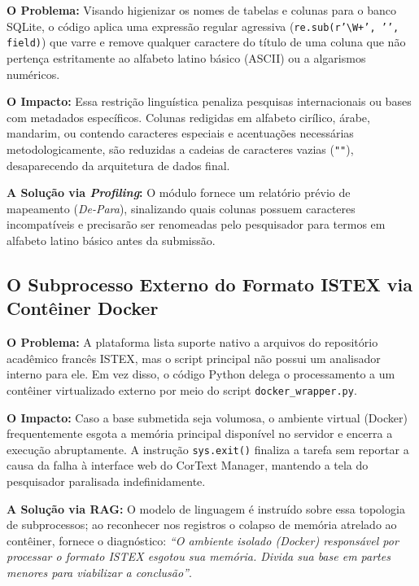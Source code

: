\documentclass[
	oneside,
	a4paper,
	12pt,
	chapter=TITLE,
	section=TITLE,
	english,
	brazilian
]{abntex2}
\begin{document}
\begin{apendicesenv}
\textbf{O Problema:} Visando higienizar os nomes de tabelas e colunas para o banco SQLite, o código aplica uma expressão regular agressiva (\texttt{re.\allowbreak sub(r'\textbackslash{}W+', '{}', field)}) que varre e remove qualquer caractere do título de uma coluna que não pertença estritamente ao alfabeto latino básico (ASCII) ou a algarismos numéricos.

\textbf{O Impacto:} Essa restrição linguística penaliza pesquisas internacionais ou bases com metadados específicos. Colunas redigidas em alfabeto cirílico, árabe, mandarim, ou contendo caracteres especiais e acentuações necessárias metodologicamente, são reduzidas a cadeias de caracteres vazias (\texttt{""}), desaparecendo da arquitetura de dados final.

\textbf{A Solução via \textit{Profiling}:} O módulo fornece um relatório prévio de mapeamento (\textit{De-Para}), sinalizando quais colunas possuem caracteres incompatíveis e precisarão ser renomeadas pelo pesquisador para termos em alfabeto latino básico antes da submissão.

\FloatBarrier
\subsection{O Subprocesso Externo do Formato ISTEX via Contêiner Docker}\label{sec:o_subprocesso_externo_do_formato_istex_v}


\textbf{O Problema:} A plataforma lista suporte nativo a arquivos do repositório acadêmico francês ISTEX, mas o script principal não possui um analisador interno para ele. Em vez disso, o código Python delega o processamento a um contêiner virtualizado externo por meio do script \texttt{docker\_\allowbreak wrapper.\allowbreak py}.

\textbf{O Impacto:} Caso a base submetida seja volumosa, o ambiente virtual (Docker) frequentemente esgota a memória principal disponível no servidor e encerra a execução abruptamente. A instrução \texttt{sys.\allowbreak exit()} finaliza a tarefa sem reportar a causa da falha à interface web do CorText Manager, mantendo a tela do pesquisador paralisada indefinidamente.

\textbf{A Solução via RAG:} O modelo de linguagem é instruído sobre essa topologia de subprocessos; ao reconhecer nos registros o colapso de memória atrelado ao contêiner, fornece o diagnóstico: \textit{``O ambiente isolado (Docker) responsável por processar o formato ISTEX esgotou sua memória. Divida sua base em partes menores para viabilizar a conclusão''}.


\end{apendicesenv}
\end{document}
